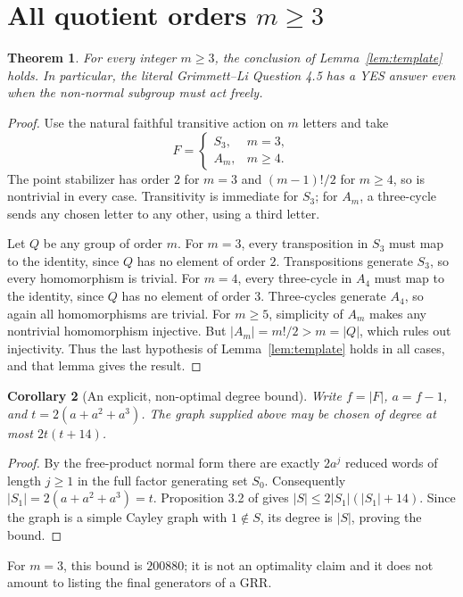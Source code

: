 \documentclass[11pt]{article}
\newtheorem{theorem}{Theorem}
\newtheorem{corollary}[theorem]{Corollary}
\begin{document}
\section{All quotient orders $m\geq3$}
\begin{theorem}\label{thm:all}
For every integer $m\geq3$, the conclusion of Lemma~\ref{lem:template}
holds. In particular, the literal Grimmett--Li Question 4.5 has a YES
answer even when the non-normal subgroup must act freely.
\end{theorem}
\begin{proof}
Use the natural faithful transitive action on $m$ letters and take
\[
 F=\begin{cases}S_3,&m=3,\\ A_m,&m\geq4.\end{cases}
\]
The point stabilizer has order $2$ for $m=3$ and $(m-1)!/2$ for $m\geq4$,
so is nontrivial in every case. Transitivity is immediate for $S_3$;
for $A_m$, a three-cycle sends any chosen letter to any other, using a
third letter.

Let $Q$ be any group of order $m$. For $m=3$, every transposition in
$S_3$ must map to the identity, since $Q$ has no element of order $2$.
Transpositions generate $S_3$, so every homomorphism is trivial.
For $m=4$, every three-cycle in $A_4$ must map to the identity, since
$Q$ has no element of order $3$. Three-cycles generate $A_4$, so again
all homomorphisms are trivial.
For $m\geq5$, simplicity of $A_m$ makes any nontrivial homomorphism
injective. But $|A_m|=m!/2>m=|Q|$, which rules out injectivity.
Thus the last hypothesis of Lemma~\ref{lem:template} holds in all cases,
and that lemma gives the result.
\end{proof}

\begin{corollary}[An explicit, non-optimal degree bound]
Write $f=|F|$, $a=f-1$, and $t=2(a+a^2+a^3)$. The graph supplied above
may be chosen of degree at most $2t(t+14)$.
\end{corollary}
\begin{proof}
By the free-product normal form there are exactly $2a^j$ reduced words
of length $j\geq1$ in the full factor generating set $S_0$.
Consequently $|S_1|=2(a+a^2+a^3)=t$.
Proposition 3.2 of \cite{LdS} gives $|S|\leq2|S_1|(|S_1|+14)$.
Since the graph is a simple Cayley graph with $1\notin S$, its degree
is $|S|$, proving the bound.
\end{proof}
For $m=3$, this bound is $200880$; it is not an optimality claim and it
does not amount to listing the final generators of a GRR.
\end{document}
